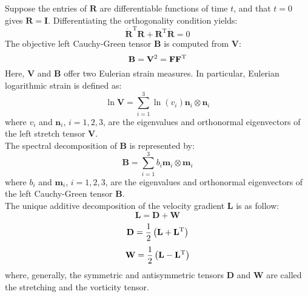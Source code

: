 Suppose the entries of $\mathbf{R}$ are differentiable functions of time $t$, and that $t = 0$ gives $\mathbf{R} = \mathbf{I}$. Differentiating the orthogonality condition yields:
\begin{equation}
\dot{\mathbf{R}}^\mathrm{T} \mathbf{R} + \mathbf{R}^\mathrm{T} \dot{\mathbf{R}} = 0
\end{equation}
The objective left Cauchy-Green tensor ${\mathbf{B}}$ is computed from ${\mathbf{V}}$:
\begin{equation}
{\mathbf{B}} = {{\mathbf{V}}^2} = {\mathbf{F}}{{\mathbf{F}}^{\rm{T}}}
\end{equation}
Here, $\mathbf{V}$ and $\mathbf{B}$ offer two Eulerian strain measures. In particular, Eulerian logarithmic strain is defined as:
\begin{equation}
\ln {\mathbf{V}} = \sum\limits_{i = 1}^3 {\ln \left( {{v _i}} \right)} {{\mathbf{n}}_i} \otimes {{\mathbf{n}}_i}
\end{equation}
where $v_i$ and ${\mathbf{n}}_i$, $i=1,2,3$, are the eigenvalues and orthonormal eigenvectors of the left stretch tensor $\mathbf{V}$.\\
The spectral decomposition of $\mathbf{B}$ is represented by:
\begin{equation}
{\mathbf{B}} = \sum\limits_{i = 1}^3 {{b_i}{{\mathbf{m}}_i} \otimes {{\mathbf{m}}_i}}
\end{equation}
where $b_i$ and ${\mathbf{m}}_i$, $i=1,2,3$, are the eigenvalues and orthonormal eigenvectors of the left Cauchy-Green tensor $\mathbf{B}$.\\
The unique additive decomposition of the velocity gradient $\mathbf{L}$ is as follow:
\begin{equation}
{\mathbf{L}} = {\mathbf{D}} + {\mathbf{W}}
\end{equation}
\begin{equation}
{\mathbf{D}} = \frac{1}{2}\left( {{\mathbf{L}} + {{\mathbf{L}}^{\rm{T}}}} \right)
\end{equation}
\begin{equation}
{\mathbf{W}} = \frac{1}{2}\left( {{\mathbf{L}} - {{\mathbf{L}}^{\rm{T}}}} \right)
\end{equation}
where, generally, the symmetric and antisymmetric tensors $\mathbf{D}$ and $\mathbf{W}$ are called the stretching and the vorticity tensor.

